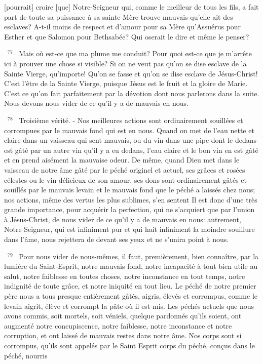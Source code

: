 \documentclass[paper=a5,pagesize=pdftex,fontsize=15pt,headinclude=on,twoside=off]{scrbook}
\newcommand{\negphantom}[1]{\settowidth{\dimen0}{#1}\hspace*{-\dimen0}}
\newcommand{\versenb}[1]{\par \vspace{10pt}~\negphantom{~${}^{#1}$~}${}^{#1}$~}
\begin{document}
[pourrait] croire [que] Notre-Seigneur qui, comme le meilleur de tous les fils, a fait part de toute sa puissance à sa
sainte Mère trouve mauvais qu'elle ait des esclaves? A-t-il moins de respect et d'amour pour sa Mère qu'Assuérus
pour Esther et que Salomon pour Bethsabée? Qui oserait le dire et même le penser?
\versenb{77} Mais où est-ce que ma plume me conduit? Pour quoi est-ce que je m'arrête ici à prouver une chose si visible?
Si on ne veut pas qu'on se dise esclave de la Sainte Vierge, qu'importe! Qu'on se fasse et qu'on se dise esclave
de Jésus-Christ! C'est l'être de la Sainte Vierge, puisque Jésus est le fruit et la gloire de Marie. C'est ce qu'on fait
parfaitement par la dévotion dont nous parlerons dans la suite.
Nous devons nous vider de ce qu'il y a de mauvais en nous.
\versenb{78} Troisième vérité. - Nos meilleures actions sont ordinairement souillées et corrompues par le mauvais fond qui
est en nous. Quand on met de l'eau nette et claire dans un vaisseau qui sent mauvais, ou du vin dans une pipe
dont le dedans est gâté par un autre vin qu'il y a eu dedans, l'eau claire et le bon vin en est gâté et en prend
aisément la mauvaise odeur. De même, quand Dieu met dans le vaisseau de notre âme gâté par le péché originel
et actuel, ses grâces et rosées célestes ou le vin délicieux de son amour, ses dons sont ordinairement gâtés et
souillés par le mauvais levain et le mauvais fond que le péché a laissés chez nous; nos actions, même des vertus
les plus sublimes, s'en sentent Il est donc d'une très grande importance, pour acquérir la perfection, qui ne
s'acquiert que par l'union à Jésus-Christ, de nous vider de ce qu'il y a de mauvais en nous: autrement, Notre
Seigneur, qui est infiniment pur et qui hait infiniment la moindre souillure dans l'âme, nous rejettera de devant ses
yeux et ne s'unira point à nous.
\versenb{79} Pour nous vider de nous-mêmes, il faut, premièrement, bien connaître, par la lumière du Saint-Esprit, notre
mauvais fond, notre incapacité à tout bien utile au salut, notre faiblesse en toutes choses, notre inconstance en
tout temps, notre indignité de toute grâce, et notre iniquité en tout lieu. Le péché de notre premier père nous a tous
presque entièrement gâtés, aigris, élevés et corrompus, comme le levain aigrit, élève et corrompt la pâte où il est
mis. Les péchés actuels que nous avons commis, soit mortels, soit véniels, quelque pardonnés qu'ils soient, ont
augmenté notre concupiscence, notre faiblesse, notre inconstance et notre corruption, et ont laissé de mauvais
restes dans notre âme.
Nos corps sont si corrompus, qu'ils sont appelés par le Saint Esprit corps du péché, conçus dans le péché, nourris
\end{document}
